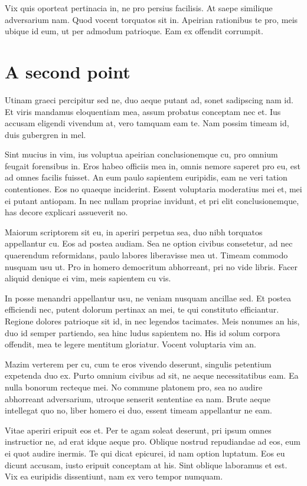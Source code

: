 \documentclass{adhsernotes}
\begin{document}
Vix quis oporteat pertinacia in, ne pro persius facilisis. At saepe similique
adversarium nam. Quod vocent torquatos sit in. Apeirian rationibus te pro, meis
ubique id eum, ut per admodum patrioque. Eam ex offendit corrumpit.

\section{A second point}

Utinam graeci percipitur sed ne, duo aeque putant ad, sonet sadipscing nam
id. Et viris mandamus eloquentiam mea, assum probatus conceptam nec et. Ius
accusam eligendi vivendum at, vero tamquam eam te. Nam possim timeam id, duis
gubergren in mel.

Sint mucius in vim, ius voluptua apeirian conclusionemque cu, pro omnium feugait
forensibus in. Eros habeo officiis mea in, omnis nemore saperet pro eu, est ad
omnes facilis fuisset. An eum paulo sapientem euripidis, eam ne veri tation
contentiones. Eos no quaeque inciderint. Essent voluptaria moderatius mei et,
mei ei putant antiopam. In nec nullam propriae invidunt, et pri elit
conclusionemque, has decore explicari assueverit no.

Maiorum scriptorem sit eu, in aperiri perpetua sea, duo nibh torquatos
appellantur cu. Eos ad postea audiam. Sea ne option civibus consetetur, ad nec
quaerendum reformidans, paulo labores liberavisse mea ut. Timeam commodo nusquam
usu ut. Pro in homero democritum abhorreant, pri no vide libris. Facer aliquid
denique ei vim, meis sapientem cu vis.

In posse menandri appellantur usu, ne veniam nusquam ancillae sed. Et postea
efficiendi nec, putent dolorum pertinax an mei, te qui constituto
efficiantur. Regione dolores patrioque sit id, in nec legendos tacimates. Meis
nonumes an his, duo id semper partiendo, sea hinc ludus sapientem no. His id
solum corpora offendit, mea te legere mentitum gloriatur. Vocent voluptaria vim
an.

Mazim verterem per cu, cum te eros vivendo deserunt, singulis petentium
expetenda duo ex. Purto omnium civibus ad sit, ne aeque necessitatibus eam. Ea
nulla bonorum recteque mei. No commune platonem pro, sea no audire abhorreant
adversarium, utroque senserit sententiae ea nam. Brute aeque intellegat quo no,
liber homero ei duo, essent timeam appellantur ne eam.

Vitae aperiri eripuit eos et. Per te agam soleat deserunt, pri ipsum omnes
instructior ne, ad erat idque aeque pro. Oblique nostrud repudiandae ad eos, eum
ei quot audire inermis. Te qui dicat epicurei, id nam option luptatum. Eos eu
dicunt accusam, iusto eripuit conceptam at his. Sint oblique laboramus et
est. Vix ea euripidis dissentiunt, nam ex vero tempor numquam.
\end{document}
